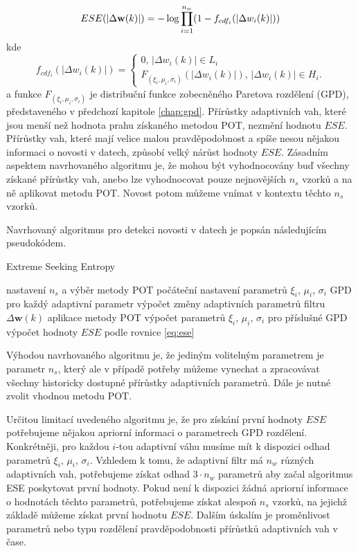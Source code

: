 \begin{equation}\label{eq:ese}
ESE(\lvert\Delta \textbf{w}(k)\rvert)=-\log \prod_{i=1}^{n_w}(1-f_{cdf_i}(\lvert\Delta w_i(k)\rvert))
\end{equation}
kde
\begin{equation}
  f_{cdf_i}(|\Delta w_i(k)|)=\begin{cases}
    0,\, |\Delta w_i(k)| \in L_i \\
    F_{(\xi_i,\mu_i,\sigma_i)}(|\Delta w_i(k)|),\, |\Delta w_i(k)| \in H_i.
  \end{cases}
\end{equation}
a funkce $F_{(\xi_i,\mu_i,\sigma_i)}$ je distribuční funkce zobecněného Paretova rozdělení (GPD), představeného v předchozí kapitole \ref{chap:gpd}. Přírůstky adaptivních vah, které jsou menší než hodnota prahu získaného metodou POT, nezmění hodnotu $ESE$. Přírůstky vah, které mají velice malou pravděpodobnost a spíše nesou nějakou informaci o novosti v datech, způsobí velký nárůst hodnoty $ESE$. Zásadním aspektem navrhovaného algoritmu je, že mohou být vyhodnocovány buď všechny získané přírůstky vah, anebo lze vyhodnocovat pouze nejnovějších $n_s$ vzorků a na ně aplikovat metodu POT. Novost potom můžeme vnímat v kontextu těchto $n_s$ vzorků. 
\par
Navrhovaný algoritmus pro detekci novosti v datech je popsán následujícím pseudokódem.

\begin{algorithm}[H]
\caption{Extreme Seeking Entropy}
\begin{algorithmic}[1]\onehalfspacing
\STATE  nastavení $n_s$ a výběr metody POT
\STATE počáteční nastavení parametrů $\xi_i$, $\mu_i$, $\sigma_i$ GPD pro každý adaptivní parametr
\STATE výpočet změny adaptivních parametrů filtru $\Delta \textbf{w}(k)$
\STATE aplikace metody POT
\STATE výpočet parametrů $\xi_i$, $\mu_i$, $\sigma_i$ pro příslušné GPD
\ENDIF
\STATE výpočet hodnoty $ESE$ podle rovnice \ref{eq:ese}
\ENDFOR
\end{algorithmic}
\end{algorithm}

Výhodou navrhovaného algoritmu je, že jediným volitelným parametrem je parametr $n_s$, který ale v případě potřeby můžeme vynechat a zpracovávat všechny historicky dostupné přírůstky adaptivních parametrů. Dále je nutné zvolit vhodnou metodu POT.
\par
Určitou limitací uvedeného algoritmu je, že pro získání první hodnoty $ESE$ potřebujeme nějakou apriorní informaci o parametrech GPD rozdělení. Konkrétněji, pro každou $i$-tou adaptivní váhu musíme mít k dispozici odhad parametrů $\xi_i$, $\mu_i$, $\sigma_i$. Vzhledem k tomu, že adaptivní filtr má $n_w$ různých adaptivních vah, potřebujeme získat odhad $3\cdot n_w$ parametrů aby začal algoritmus ESE poskytovat první hodnoty. Pokud není k dispozici žádná apriorní informace o hodnotách těchto parametrů, potřebujeme získat alespoň $n_s$ vzorků, na jejichž základě můžeme získat první hodnotu $ESE$. Dalším úskalím je proměnlivost parametrů nebo typu rozdělení pravděpodobnosti přírůstků adaptivních vah v čase.